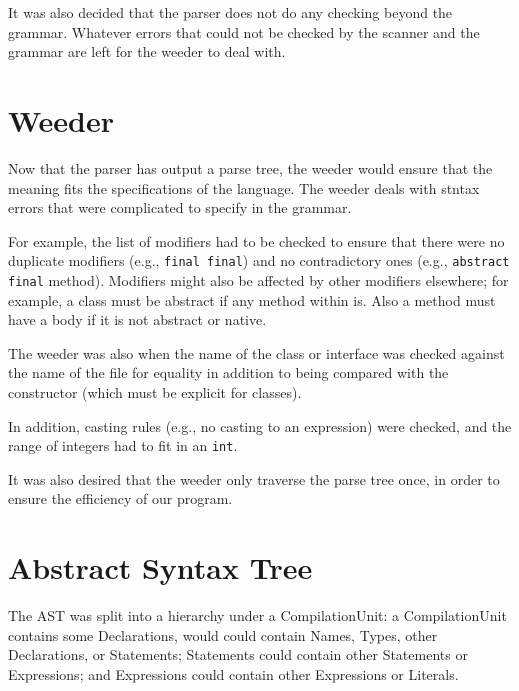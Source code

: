 It was also decided that the parser does not do any checking beyond the grammar. Whatever errors that could not be checked by the scanner and the grammar are left for the weeder to deal with.

\section{Weeder}
Now that the parser has output a parse tree, the weeder would ensure that the meaning fits the specifications of the language. The weeder deals with stntax errors that were complicated to specify in the grammar.

For example, the list of modifiers had to be checked to ensure that there were no duplicate modifiers (e.g., \verb|final final|)
  and no contradictory ones (e.g., \verb|abstract final| method).
Modifiers might also be affected by other modifiers elsewhere; for example, a class must be abstract if any method within is. Also a method must have a body if it is not abstract or native.

The weeder was also when the name of the class or interface was checked against the name of the file for equality
  in addition to being compared with the constructor (which must be explicit for classes).

In addition, casting rules (e.g., no casting to an expression) were checked,
  and the range of integers had to fit in an \verb|int|.

It was also desired that the weeder only traverse the parse tree once, in order to ensure the efficiency of our program.

\section{Abstract Syntax Tree}
The AST was split into a hierarchy under a CompilationUnit:
  a CompilationUnit contains some Declarations, would could contain Names, Types, other Declarations, or Statements;
  Statements could contain other Statements or Expressions; and Expressions could contain other Expressions or Literals.


